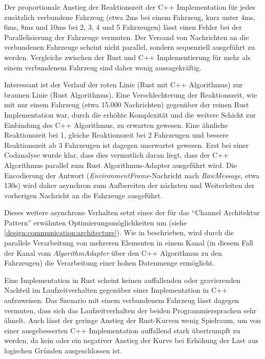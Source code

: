 Der proportionale Anstieg der Reaktionszeit der C++ Implementation für jedes zusätzlich verbundene Fahrzeug (etwa 2ms bei einem Fahrzeug, kurz unter 4ms, 6ms, 8ms und 10ms bei 2, 3, 4 und 5 Fahrzeugen) lässt einen Fehler bei der Parallelisierung der Fahrzeuge vermuten.
Der Versand von Nachrichten an die verbundenen Fahrzeuge scheint nicht parallel, sondern sequenziell ausgeführt zu werden.
Vergleiche zwischen der Rust und C++ Implementierung für mehr als einem verbundenem Fahrzeug sind daher wenig aussagekräftig.

Interessant ist der Verlauf der roten Linie (Rust mit C++ Algorithmus) zur braunen Linie (Rust Algorithmus).
Eine Verschlechterung der Reaktionszeit, wie mit nur einem Fahrzeug (etwa 15.000 Nachrichten) gegenüber der reinen Rust Implementation war, durch die erhöhte Komplexität und die weitere Schicht zur Einbindung des C++ Algorithmus, zu erwarten gewesen.
Eine ähnliche Reaktionszeit bei 1, gleiche Reaktionszeit bei 2 Fahrzeugen und bessere Reaktionszeit ab 3 Fahrzeugen ist dagegen unerwartet gewesen.
Erst bei einer Codanalyse wurde klar, dass dies vermutlich daran liegt, dass der C++ Algorithmus parallel zum Rust Algorithmus-Adapter ausgeführt wird.
Die Encodierung der Antwort (\textit{EnvironmentFrame}-Nachricht nach \textit{RawMessage}, etwa 130\textmu s) wird daher asynchron zum Aufbereiten der nächsten und Weiterleiten der vorherigen Nachricht an die Fahrzeuge ausgeführt.

Dieses weitere asynchrone Verhalten setzt eines der für das \enquote{Channel Architektur Pattern} erwähnten Optimierungsmöglichkeiten um (siehe \autoref{design:communication:architecture}).
Wie in \cite[160]{douglass2003real} beschrieben, wird durch die parallele Verarbeitung von mehreren Elementen in einem Kanal (in diesem Fall der Kanal vom \textit{AlgorithmAdapter} über den C++ Algorithmus zu den Fahrzeugen) die Verarbeitung einer hohen Datenmenge ermöglicht.

Eine Implementation in Rust scheint keinen auffallenden oder gravierenden Nachteil im Laufzeitverhalten gegenüber einer Implementation in C++ aufzuweisen.
Das Szenario mit einem verbundenem Fahrzeug lässt dagegen vermuten, dass sich das Laufzeitverhalten der beiden Programmiersprachen sehr ähnelt.
Auch lässt der geringe Anstieg der Rust-Kurven wenig Spielraum, um von einer ausgebesserten C++ Implementation auffallend stark übertrumpft zu werden, da
kein oder ein negativer Anstieg der Kurve bei Erhöhung der Last aus logischen Gründen ausgeschlossen ist.

